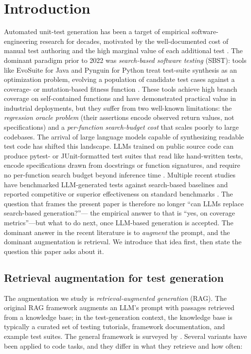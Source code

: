 \documentclass[smallextended]{svjour3}
\begin{document}
\section{Introduction}\label{sec:introduction}
Automated unit-test generation has been a target of empirical
software-engineering research for decades, motivated by the
well-documented cost of manual test authoring and the high marginal
value of each additional test \citep{daka2014,almasi2017}. The
dominant paradigm prior to 2022 was \emph{search-based software
testing} (SBST): tools like EvoSuite for Java and Pynguin for Python
treat test-suite synthesis as an optimization problem, evolving a
population of candidate test cases against a coverage- or
mutation-based fitness function \citep{fraser2011,lukasczyk2022}.
These tools achieve high branch coverage on self-contained functions
and have demonstrated practical value in industrial deployments, but
they suffer from two well-known limitations: the
\emph{regression oracle problem} (their assertions encode observed
return values, not specifications) and a \emph{per-function
search-budget cost} that scales poorly to large codebases. The
arrival of large language models capable of synthesizing readable
test code has shifted this landscape. LLMs trained on public source
code can produce pytest- or JUnit-formatted test suites that read
like hand-written tests, encode specifications drawn from docstrings
or function signatures, and require no per-function search budget
beyond inference time \citep{schafer2024,tufano2022}. Multiple recent studies have benchmarked
LLM-generated tests against search-based baselines and reported
competitive or superior effectiveness on standard benchmarks
\citep{schafer2024,lemieux2023codamosa,dakhel2024mutation,
straubinger2025debug,konstantinou2026newer}. The question that frames the present paper is
therefore no longer ``can LLMs replace search-based generation?''---
the empirical answer to that is ``yes, on coverage metrics''---but
what to do next, once LLM-based generation is accepted. The dominant
answer in the recent literature is to \emph{augment} the prompt, and
the dominant augmentation is retrieval. We introduce that idea first,
then state the question this paper asks about it.

\subsection{Retrieval augmentation for test
generation}\label{sec:intro-rag}
The augmentation we study is \emph{retrieval-augmented generation}
(RAG). The original RAG
framework \citep{lewis2020} augments an LLM's prompt with passages
retrieved from a knowledge base; in the test-generation context, the
knowledge base is typically a curated set of testing tutorials,
framework documentation, and example test suites. The general framework is surveyed by
\citet{rag4code2025}. Several variants have been applied to code
tasks, and they differ in what they retrieve and how often:
\end{document}
